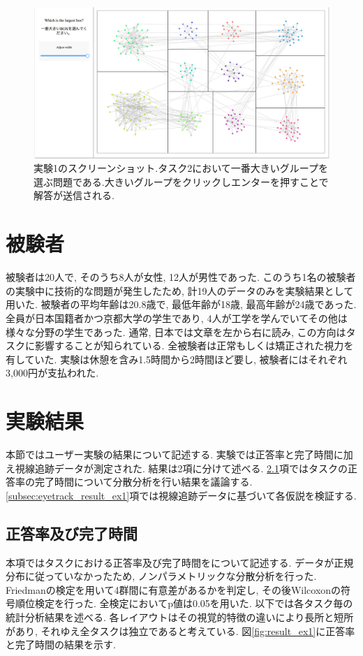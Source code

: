 \documentclass{kuee}
\begin{document}
\begin{figure}
  \centering
  \includegraphics[width=15cm]{./images/screenshot.png}
  \caption{実験1のスクリーンショット.タスク2において一番大きいグループを選ぶ問題である.大きいグループをクリックしエンターを押すことで解答が送信される. \label{fig:screenshot_ex1}}
\end{figure}

\section{被験者}
\label{sec:participants}
被験者は20人で, そのうち8人が女性, 12人が男性であった.
このうち1名の被験者の実験中に技術的な問題が発生したため, 計19人のデータのみを実験結果として用いた.
被験者の平均年齢は20.8歳で, 最低年齢が18歳, 最高年齢が24歳であった.
全員が日本国籍者かつ京都大学の学生であり, 4人が工学を学んでいてその他は様々な分野の学生であった.
通常, 日本では文章を左から右に読み, この方向はタスクに影響することが知られている\cite{yarbus1967eye}.
全被験者は正常もしくは矯正された視力を有していた.
実験は休憩を含み1.5時間から2時間ほど要し, 被験者にはそれぞれ3,000円が支払われた.

\section{実験結果}
\label{sec:result_ex1}
本節ではユーザー実験の結果について記述する.
実験では正答率と完了時間に加え視線追跡データが測定された.
結果は2項に分けて述べる.
\ref{subsec:task_result_ex1}項ではタスクの正答率の完了時間について分散分析を行い結果を議論する.
\ref{subsec:eyetrack_result_ex1}項では視線追跡データに基づいて各仮説を検証する.

\subsection{正答率及び完了時間}
\label{subsec:task_result_ex1}
本項ではタスクにおける正答率及び完了時間をについて記述する.
データが正規分布に従っていなかったため, ノンパラメトリックな分散分析を行った.
Friedmanの検定を用いて4群間に有意差があるかを判定し, その後Wilcoxonの符号順位検定を行った.
全検定においてp値は0.05を用いた.
以下では各タスク毎の統計分析結果を述べる.
各レイアウトはその視覚的特徴の違いにより長所と短所があり, それゆえ全タスクは独立であると考えている.
図\ref{fig:result_ex1}に正答率と完了時間の結果を示す.
\end{document}
